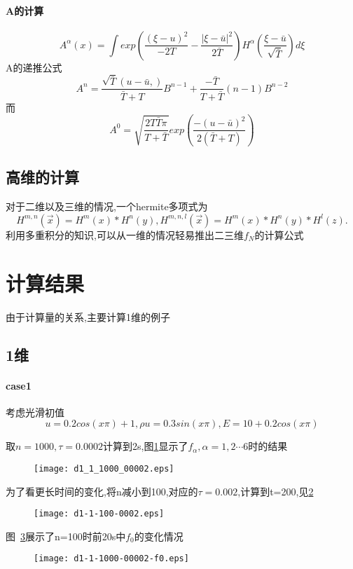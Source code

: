 \documentclass[UTF8]{ctexart}
\begin{document}
    \paragraph{A的计算}

    $$A^{\alpha}(x)=\int  exp(\frac{(\xi-u)^2}{-2T}-\frac{|\xi-\bar{u}|^2}{2\bar{T}})H^{\alpha}(\frac{\xi-\bar{u}}{\sqrt{\bar{T}}})d\xi$$
  A的递推公式
    $$
    A^n = \frac{\sqrt{\bar{T}}(u-\bar{u},)}{\bar{T}+T}B^{n-1}+\frac{-\bar{T}}{T+\bar{T}}(n-1)B^{n-2}
    $$
    而
    $$
    A^0 = \sqrt{\frac{2T\bar{T}\pi}{T+\bar{T}}}exp(\frac{-(u-\bar{u})^2}{2(\bar{T}+T)})
    $$
    \subsection{高维的计算}
    对于二维以及三维的情况,一个hermite多项式为
    $$
    H^{m,n}(\vec{x})=H^{m}(x)*H^n(y),H^{m,n,l}(\vec{x})=H^{m}(x)*H^n(y)*H^l(z).
    $$
    利用多重积分的知识,可以从一维的情况轻易推出二三维$f_N$的计算公式
\section{计算结果}
由于计算量的关系,主要计算1维的例子
\subsection{1维}
\paragraph{case1}
考虑光滑初值
$$u=0.2cos(x\pi)+1,\rho u=0.3sin(x\pi),E=10+0.2cos(x\pi)$$

取$n=1000,\tau=0.0002$计算到2s,图\ref{fig:1}显示了$f_{\alpha},\alpha=1,2\cdots 6$时的结果
\begin{figure}[htbp]
\centering\texttt{[image: d1\_1\_1000\_00002.eps]}
\caption{}\label{fig:1}
\end{figure}
为了看更长时间的变化,将n减小到100,对应的$\tau=0.002$,计算到t=200,见\ref{fig:2}
\begin{figure}[htbp]
\centering\texttt{[image: d1-1-100-0002.eps]}
\caption{}\label{fig:2}
\end{figure}
图~\ref{fig:3}展示了n=100时前20s中$f_0$的变化情况
\begin{figure}[htbp]
\centering\texttt{[image: d1-1-1000-00002-f0.eps]}
\caption{}\label{fig:3}
\end{figure}
\end{document}
